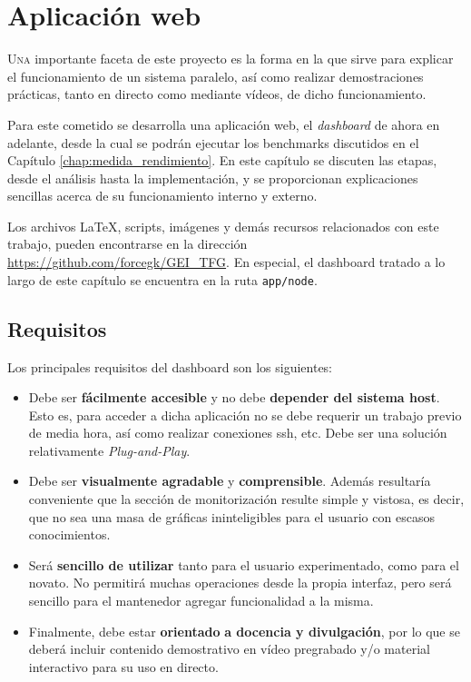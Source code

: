 \chapter{Aplicación web}
\label{chap:aplicacion_web}

\lettrine{U}{na} importante faceta de este proyecto es la forma en la que sirve para explicar el funcionamiento de un sistema paralelo, así como realizar demostraciones prácticas, tanto en directo como mediante vídeos, de dicho funcionamiento.

Para este cometido se desarrolla una aplicación web, el \textit{dashboard} de ahora en adelante, desde la cual se podrán ejecutar los benchmarks discutidos en el Capítulo \ref{chap:medida_rendimiento}. En este capítulo se discuten las etapas, desde el análisis hasta la implementación, y se proporcionan explicaciones sencillas acerca de su funcionamiento interno y externo.

Los archivos \LaTeX, scripts, imágenes y demás recursos relacionados con este trabajo, pueden encontrarse en la dirección \url{https://github.com/forcegk/GEI_TFG}. En especial, el dashboard tratado a lo largo de este capítulo se encuentra en la ruta \texttt{app/node}. 

\section{Requisitos}
Los principales requisitos del dashboard son los siguientes:

\begin{itemize}
    \item Debe ser \textbf{fácilmente accesible} y no debe \textbf{depender del sistema host}. Esto es, para acceder a dicha aplicación no se debe requerir un trabajo previo de media hora, así como realizar conexiones \acrshort{ssh}, etc. Debe ser una solución relativamente \textit{Plug-and-Play}.
    \item Debe ser \textbf{visualmente agradable} y \textbf{comprensible}. Además resultaría conveniente que la sección de monitorización resulte simple y vistosa, es decir, que no sea una masa de gráficas ininteligibles para el usuario con escasos conocimientos.
    \item Será \textbf{sencillo de utilizar} tanto para el usuario experimentado, como para el novato. No permitirá muchas operaciones desde la propia interfaz, pero será sencillo para el mantenedor agregar funcionalidad a la misma.
    \item Finalmente, debe estar \textbf{orientado} \textbf{a docencia y divulgación}, por lo que se deberá incluir contenido demostrativo en vídeo pregrabado y/o material interactivo para su uso en directo.
\end{itemize}


